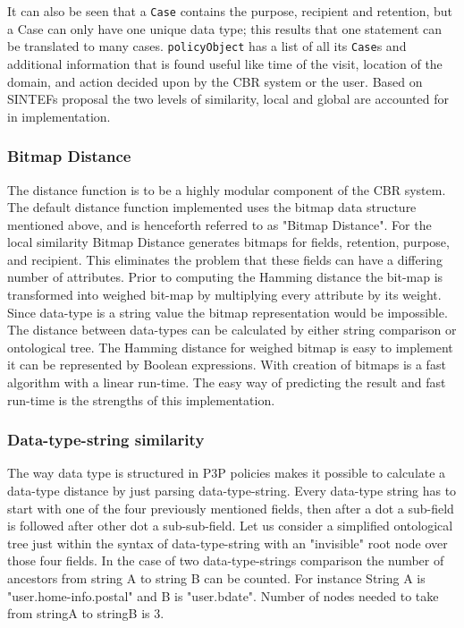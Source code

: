 It can also be seen that a \texttt{Case} contains the purpose, recipient and retention, but a Case can only have one unique data type; this results that one statement can be translated to many cases. \texttt{policyObject} has a list of all its \texttt{Case}s and additional information that is found useful like time of the visit, location of the domain, and action decided upon by the CBR system or the user. Based on SINTEFs proposal the two levels of similarity, local and global are accounted for in implementation. 

\subsubsection{Bitmap Distance}

The distance function is to be a highly modular component of the CBR system. The default distance function implemented uses the bitmap data structure mentioned above, and is henceforth referred to as "Bitmap Distance". For the local similarity Bitmap Distance generates bitmaps for fields, retention, purpose, and recipient. This eliminates the problem that these fields can have a differing number of attributes.  Prior to computing the Hamming distance the bit-map is transformed into weighed bit-map by multiplying every attribute by its weight. Since data-type is a string value the bitmap representation would be impossible. The distance between data-types can be calculated by either string comparison or ontological tree. The Hamming distance for weighed bitmap is easy to implement it can be represented by Boolean expressions. With creation of bitmaps is a fast algorithm with a linear run-time. The easy way of predicting the result and fast run-time is the strengths of this implementation.



\subsubsection{Data-type-string similarity}
The way data type is structured in P3P policies makes it possible to calculate a data-type distance by just parsing data-type-string. Every data-type string has to start with one of the four previously mentioned fields, then after a dot a sub-field is followed after other dot a sub-sub-field. Let us consider a simplified ontological tree just within the syntax of data-type-string with an "invisible" root node over those four fields. In the case of two data-type-strings comparison the number of ancestors from string A to string B can be counted. For instance String A is "user.home-info.postal" and B is "user.bdate". Number of nodes needed to take from stringA to stringB is 3. 

